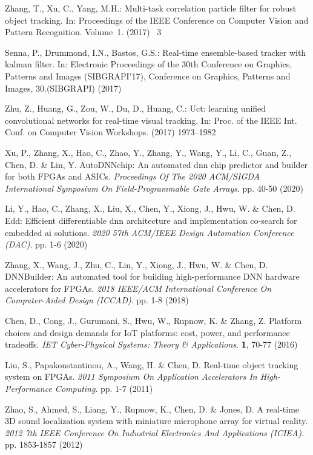 \documentclass[runningheads]{llncs}
\begin{document}
\begin{thebibliography}{10}
Zhang, T., Xu, C., Yang, M.H.:
\newblock Multi-task correlation particle filter for robust object tracking.
\newblock In: Proceedings of the IEEE Conference on Computer Vision and Pattern
  Recognition. Volume~1. (2017) ~3

Senna, P., Drummond, I.N., Bastos, G.S.:
\newblock Real-time ensemble-based tracker with kalman filter.
\newblock In: Electronic Proceedings of the 30th Conference on Graphics,
  Patterns and Images (SIBGRAPI'17), Conference on Graphics, Patterns and
  Images, 30.(SIBGRAPI) (2017)

Zhu, Z., Huang, G., Zou, W., Du, D., Huang, C.:
\newblock Uct: learning unified convolutional networks for real-time visual
  tracking.
\newblock In: Proc. of the IEEE Int. Conf. on Computer Vision Workshops. (2017)
   1973--1982

Xu, P., Zhang, X., Hao, C., Zhao, Y., Zhang, Y., Wang, Y., Li, C., Guan, Z., Chen, D. \& Lin, Y. AutoDNNchip: An automated dnn chip predictor and builder for both FPGAs and ASICs. {\em Proceedings Of The 2020 ACM/SIGDA International Symposium On Field-Programmable Gate Arrays}. pp. 40-50 (2020)

Li, Y., Hao, C., Zhang, X., Liu, X., Chen, Y., Xiong, J., Hwu, W. \& Chen, D. Edd: Efficient differentiable dnn architecture and implementation co-search for embedded ai solutions. {\em 2020 57th ACM/IEEE Design Automation Conference (DAC)}. pp. 1-6 (2020)

Zhang, X., Wang, J., Zhu, C., Lin, Y., Xiong, J., Hwu, W. \& Chen, D. DNNBuilder: An automated tool for building high-performance DNN hardware accelerators for FPGAs. {\em 2018 IEEE/ACM International Conference On Computer-Aided Design (ICCAD)}. pp. 1-8 (2018)

Chen, D., Cong, J., Gurumani, S., Hwu, W., Rupnow, K. \& Zhang, Z. Platform choices and design demands for IoT platforms: cost, power, and performance tradeoffs. {\em IET Cyber-Physical Systems: Theory \& Applications}. \textbf{1}, 70-77 (2016)

Liu, S., Papakonstantinou, A., Wang, H. \& Chen, D. Real-time object tracking system on FPGAs. {\em 2011 Symposium On Application Accelerators In High-Performance Computing}. pp. 1-7 (2011)

Zhao, S., Ahmed, S., Liang, Y., Rupnow, K., Chen, D. \& Jones, D. A real-time 3D sound localization system with miniature microphone array for virtual reality. {\em 2012 7th IEEE Conference On Industrial Electronics And Applications (ICIEA)}. pp. 1853-1857 (2012)


\end{thebibliography}
\end{document}
